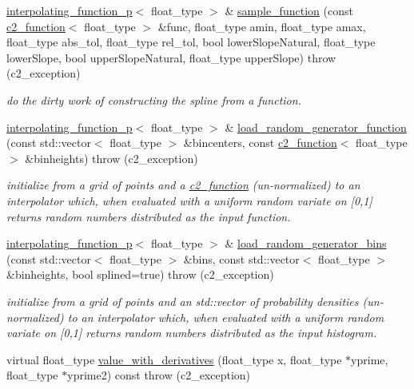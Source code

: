 \begin{DoxyCompactItemize}
\hyperlink{classinterpolating__function__p}{interpolating\+\_\+function\+\_\+p}$<$ float\+\_\+type $>$ \& \hyperlink{classinterpolating__function__p_a7a241d879e2fb7cf50566fbb06c63066}{sample\+\_\+function} (const \hyperlink{classc2__function}{c2\+\_\+function}$<$ float\+\_\+type $>$ \&func, float\+\_\+type amin, float\+\_\+type amax, float\+\_\+type abs\+\_\+tol, float\+\_\+type rel\+\_\+tol, bool lower\+Slope\+Natural, float\+\_\+type lower\+Slope, bool upper\+Slope\+Natural, float\+\_\+type upper\+Slope)  throw (c2\+\_\+exception)
\begin{DoxyCompactList}\small\item\em do the dirty work of constructing the spline from a function. \end{DoxyCompactList}\item 
\hyperlink{classinterpolating__function__p}{interpolating\+\_\+function\+\_\+p}$<$ float\+\_\+type $>$ \& \hyperlink{classinterpolating__function__p_ad9a0b81a99d4ee1fe4511e2435a7f0e0}{load\+\_\+random\+\_\+generator\+\_\+function} (const std\+::vector$<$ float\+\_\+type $>$ \&bincenters, const \hyperlink{classc2__function}{c2\+\_\+function}$<$ float\+\_\+type $>$ \&binheights)  throw (c2\+\_\+exception)
\begin{DoxyCompactList}\small\item\em initialize from a grid of points and a \hyperlink{classc2__function}{c2\+\_\+function} (un-\/normalized) to an interpolator which, when evaluated with a uniform random variate on \mbox{[}0,1\mbox{]} returns random numbers distributed as the input function. \end{DoxyCompactList}\item 
\hyperlink{classinterpolating__function__p}{interpolating\+\_\+function\+\_\+p}$<$ float\+\_\+type $>$ \& \hyperlink{classinterpolating__function__p_a8587a27f028c9f6d8889967c38d25d88}{load\+\_\+random\+\_\+generator\+\_\+bins} (const std\+::vector$<$ float\+\_\+type $>$ \&bins, const std\+::vector$<$ float\+\_\+type $>$ \&binheights, bool splined=true)  throw (c2\+\_\+exception)
\begin{DoxyCompactList}\small\item\em initialize from a grid of points and an std\+::vector of probability densities (un-\/normalized) to an interpolator which, when evaluated with a uniform random variate on \mbox{[}0,1\mbox{]} returns random numbers distributed as the input histogram. \end{DoxyCompactList}\item 
virtual float\+\_\+type \hyperlink{classinterpolating__function__p_a321e6a9a8e598ebb0ae77ce265742ed7}{value\+\_\+with\+\_\+derivatives} (float\+\_\+type x, float\+\_\+type $\ast$yprime, float\+\_\+type $\ast$yprime2) const   throw (c2\+\_\+exception)

\end{DoxyCompactItemize}
